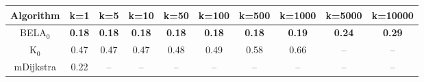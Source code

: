 \begin{tabular}{c|ccccccccc}\toprule
Algorithm & k=1 & k=5 & k=10 & k=50 & k=100 & k=500 & k=1000 & k=5000 & k=10000 \\ \midrule
BELA$_0$ & \textbf{0.18} & \textbf{0.18} & \textbf{0.18} & \textbf{0.18} & \textbf{0.18} & \textbf{0.18} & \textbf{0.19} & \textbf{0.24} & \textbf{0.29} \\
K$_0$ & 0.47 & 0.47 & 0.47 & 0.48 & 0.49 & 0.58 & 0.66 & -- & -- \\
mDijkstra & 0.22 & -- & -- & -- & -- & -- & -- & -- & -- \\ \bottomrule 
\end{tabular}
